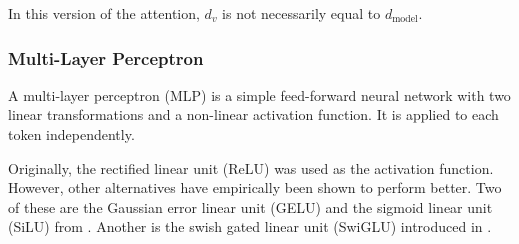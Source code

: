 In this version of the attention, \(d_v\) is not necessarily equal to \(d_{\mathrm{model}}\).

\subsubsection*{Multi-Layer Perceptron}

A multi-layer perceptron (MLP) is a simple feed-forward neural network with two linear transformations and a non-linear activation function. It is applied to each token independently.

Originally, the rectified linear unit (ReLU) was used as the activation function. However, other alternatives have empirically been shown to perform better. Two of these are the Gaussian error linear unit (GELU) and the sigmoid linear unit (SiLU) from \citet{hendrycks2023}. Another is the swish gated linear unit (SwiGLU) introduced in \citet{shazeer2020}.
